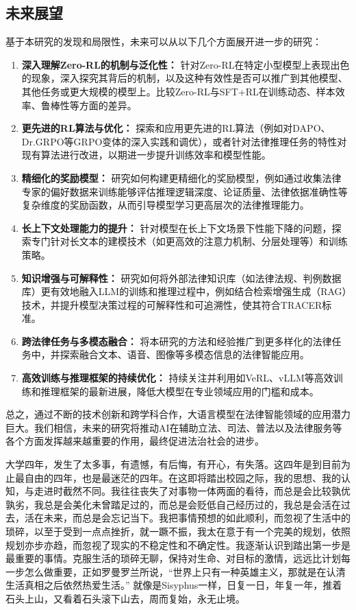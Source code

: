 \documentclass{pkuthesis}
\begin{document}
\subsection{未来展望}
基于本研究的发现和局限性，未来可以从以下几个方面展开进一步的研究：
\begin{enumerate}
    \item \textbf{深入理解Zero-RL的机制与泛化性：} 针对Zero-RL在特定小型模型上表现出色的现象，深入探究其背后的机制，以及这种有效性是否可以推广到其他模型、其他任务或更大规模的模型上。比较Zero-RL与SFT+RL在训练动态、样本效率、鲁棒性等方面的差异。
    \item \textbf{更先进的RL算法与优化：} 探索和应用更先进的RL算法（例如对DAPO、Dr.GRPO等GRPO变体的深入实践和调优），或者针对法律推理任务的特性对现有算法进行改进，以期进一步提升训练效率和模型性能。
    \item \textbf{精细化的奖励模型：} 研究如何构建更精细化的奖励模型，例如通过收集法律专家的偏好数据来训练能够评估推理逻辑深度、论证质量、法律依据准确性等复杂维度的奖励函数，从而引导模型学习更高层次的法律推理能力。
    \item \textbf{长上下文处理能力的提升：} 针对模型在长上下文场景下性能下降的问题，探索专门针对长文本的建模技术（如更高效的注意力机制、分层处理等）和训练策略。
    \item \textbf{知识增强与可解释性：} 研究如何将外部法律知识库（如法律法规、判例数据库）更有效地融入LLM的训练和推理过程中，例如结合检索增强生成（RAG）技术，并提升模型决策过程的可解释性和可追溯性，使其符合TRACER标准。
    \item \textbf{跨法律任务与多模态融合：} 将本研究的方法和经验推广到更多样化的法律任务中，并探索融合文本、语音、图像等多模态信息的法律智能应用。
    \item \textbf{高效训练与推理框架的持续优化：} 持续关注并利用如VeRL、vLLM等高效训练和推理框架的最新进展，降低大模型在专业领域应用的门槛和成本。
\end{enumerate}
总之，通过不断的技术创新和跨学科合作，大语言模型在法律智能领域的应用潜力巨大。我们相信，未来的研究将推动AI在辅助立法、司法、普法以及法律服务等各个方面发挥越来越重要的作用，最终促进法治社会的进步。

\printbibliography

\Acknowledgments

大学四年，发生了太多事，有遗憾，有后悔，有开心，有失落。这四年是到目前为止最自由的四年，也是最迷茫的四年。在这即将踏出校园之际，我的思想、我的认知，与走进时截然不同。我往往丧失了对事物一体两面的看待，而总是会比较孰优孰劣，我总是会美化未曾踏足过的，而总是会贬低自己经历过的，我总是会活在过去，活在未来，而总是会忘记当下。我把事情预想的如此顺利，而忽视了生活中的琐碎，以至于受到一点点挫折，就一蹶不振，我太在意于有一个完美的规划，依照规划亦步亦趋，而忽视了现实的不稳定性和不确定性。我逐渐认识到踏出第一步是最重要的事情。克服生活的琐碎无聊，保持对生命、对目标的激情，远远比计划每一步怎么做重要，正如罗曼罗兰所说，“世界上只有一种英雄主义，那就是在认清生活真相之后依然热爱生活。”
就像是Sisyphus一样，日复一日，年复一年，推着石头上山，又看着石头滚下山去，周而复始，永无止境。
\end{document}

